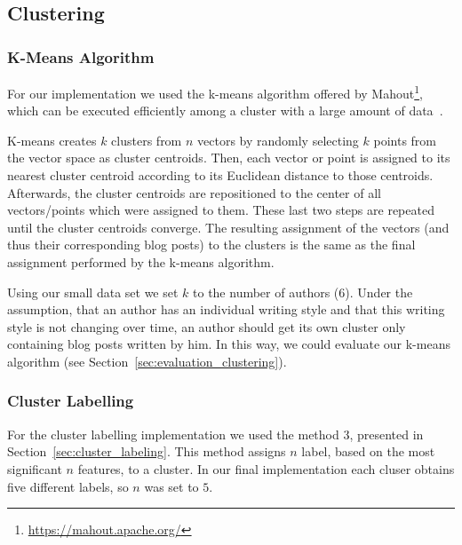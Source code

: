 \subsection{Clustering}
\label{sec:impl_clustering}


\subsubsection{K-Means Algorithm}
\label{sec:impl_k-means}
For our implementation we used the k-means algorithm offered by Mahout\footnote{\url{https://mahout.apache.org/}}, which can be executed efficiently among a cluster with a large amount of data~\cite{esteves2011k}.


K-means creates $k$ clusters from $n$ vectors by randomly selecting $k$ points from the vector space as cluster centroids.
Then, each vector or point is assigned to its nearest cluster centroid according to its Euclidean distance to those centroids.
Afterwards, the cluster centroids are repositioned to the center of all vectors/points which were assigned to them.
These last two steps are repeated until the cluster centroids converge.
The resulting assignment of the vectors (and thus their corresponding blog posts) to the clusters is the same as the final assignment performed by the k-means algorithm.


Using our small data set we set $k$ to the number of authors ($6$).
Under the assumption, that an author has an individual writing style and that this writing style is not changing over time, an author should get its own cluster only containing blog posts written by him.
In this way, we could evaluate our k-means algorithm (see Section~\ref{sec:evaluation_clustering}).


\subsubsection{Cluster Labelling}
\label{sec:impl_cluster_labeling}
For the cluster labelling implementation we used the method 3, presented in Section~\ref{sec:cluster_labeling}.
This method assigns $n$ label, based on the most significant $n$ features, to a cluster.
In our final implementation each cluser obtains five different labels, so $n$ was set to $5$.